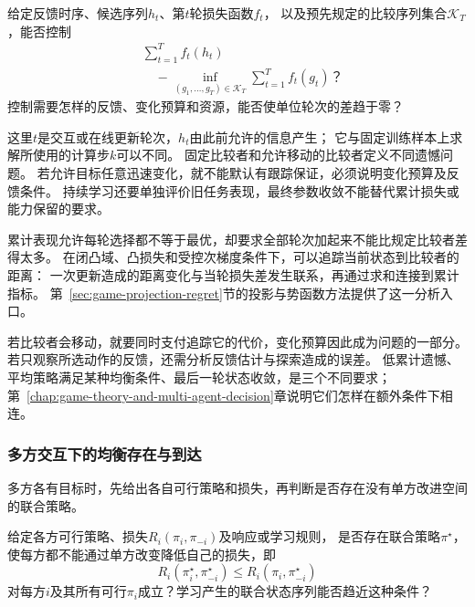 \begin{mathproblem}[序列相对于比较者的累计表现]
  \label{question:future-cumulative-comparison}
  给定反馈时序、候选序列$h_t$、第$t$轮损失函数$f_t$，
  以及预先规定的比较序列集合$\mathcal K_T$，能否控制
  \[
    \begin{aligned}
      &\sum_{t=1}^Tf_t(h_t)\\
      &\quad-\inf_{(g_1,\ldots,g_T)\in\mathcal K_T}
         \sum_{t=1}^Tf_t(g_t)\text{？}
    \end{aligned}
  \]
  控制需要怎样的反馈、变化预算和资源，能否使单位轮次的差趋于零？
\end{mathproblem}

这里$t$是交互或在线更新轮次，$h_t$由此前允许的信息产生；
它与固定训练样本上求解所使用的计算步$k$可以不同。
固定比较者和允许移动的比较者定义不同遗憾问题。
若允许目标任意迅速变化，就不能默认有跟踪保证，必须说明变化预算及反馈条件。
持续学习还要单独评价旧任务表现，最终参数收敛不能替代累计损失或能力保留的要求。

累计表现允许每轮选择都不等于最优，却要求全部轮次加起来不能比规定比较者差得太多。
在闭凸域、凸损失和受控次梯度条件下，可以追踪当前状态到比较者的距离：
一次更新造成的距离变化与当轮损失差发生联系，再通过求和连接到累计指标。
第~\ref{sec:game-projection-regret}节的投影与势函数方法提供了这一分析入口。

若比较者会移动，就要同时支付追踪它的代价，变化预算因此成为问题的一部分。
若只观察所选动作的反馈，还需分析反馈估计与探索造成的误差。
低累计遗憾、平均策略满足某种均衡条件、最后一轮状态收敛，是三个不同要求；
第~\ref{chap:game-theory-and-multi-agent-decision}章说明它们怎样在额外条件下相连。

\subsubsection{多方交互下的均衡存在与到达}
\label{sec:future-analysis-equilibrium}

多方各有目标时，先给出各自可行策略和损失，再判断是否存在没有单方改进空间的联合策略。

\begin{mathproblem}[多方响应能否达到所求均衡]
  \label{question:future-equilibrium}
  给定各方可行策略、损失$R_i(\pi_i,\pi_{-i})$及响应或学习规则，
  是否存在联合策略$\pi^\star$，使每方都不能通过单方改变降低自己的损失，即
  \[
    R_i(\pi_i^\star,\pi_{-i}^\star)
    \leq R_i(\pi_i,\pi_{-i}^\star)
  \]
  对每方$i$及其所有可行$\pi_i$成立？学习产生的联合状态序列能否趋近这种条件？
\end{mathproblem}

